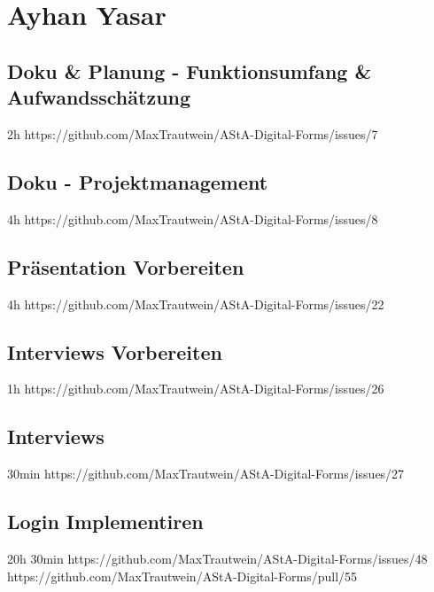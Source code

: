 \subsection{}


\subsection{}


\section{Ayhan Yasar}\label{sec:ayhan-yasar}

\subsection{Doku & Planung - Funktionsumfang & Aufwandsschätzung}
2h
https://github.com/MaxTrautwein/AStA-Digital-Forms/issues/7

\subsection{Doku - Projektmanagement}
4h
https://github.com/MaxTrautwein/AStA-Digital-Forms/issues/8


\subsection{Präsentation Vorbereiten}
4h
https://github.com/MaxTrautwein/AStA-Digital-Forms/issues/22
\subsection{Interviews Vorbereiten}
1h
https://github.com/MaxTrautwein/AStA-Digital-Forms/issues/26
\subsection{Interviews}
30min
https://github.com/MaxTrautwein/AStA-Digital-Forms/issues/27
\subsection{Login Implementiren}
20h 30min
https://github.com/MaxTrautwein/AStA-Digital-Forms/issues/48
https://github.com/MaxTrautwein/AStA-Digital-Forms/pull/55
\subsection{}


